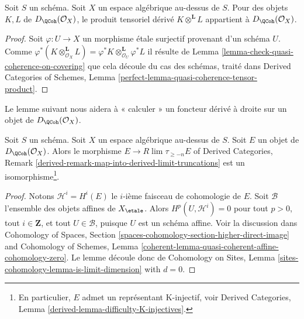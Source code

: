 \begin{lemma}
\label{lemma-quasi-coherence-tensor-product}
Soit $S$ un schéma. Soit $X$ un espace algébrique au-dessus de $S$.
Pour des objets $K, L$ de $D_\QCoh(\mathcal{O}_X)$,
le produit tensoriel dérivé $K \otimes^\mathbf{L} L$ appartient à
$D_\QCoh(\mathcal{O}_X)$.
\end{lemma}

\begin{proof}
Soit $\varphi : U \to X$ un morphisme étale surjectif provenant d'un schéma $U$.
Comme
$\varphi^*(K \otimes_{\mathcal{O}_X}^\mathbf{L} L) =
\varphi^*K \otimes_{\mathcal{O}_U}^\mathbf{L} \varphi^*L$
il résulte de
Lemma \ref{lemma-check-quasi-coherence-on-covering}
que cela découle du cas des schémas, traité dans
Derived Categories of Schemes, Lemma
\ref{perfect-lemma-quasi-coherence-tensor-product}.
\end{proof}

\noindent
Le lemme suivant nous aidera à « calculer » un foncteur dérivé à droite
sur un objet de $D_\QCoh(\mathcal{O}_X)$.

\begin{lemma}
\label{lemma-nice-K-injective}
Soit $S$ un schéma. Soit $X$ un espace algébrique au-dessus de $S$. Soit $E$ un
objet de $D_\QCoh(\mathcal{O}_X)$. Alors le morphisme
$E \to R\lim \tau_{\geq -n}E$ of
Derived Categories, Remark
\ref{derived-remark-map-into-derived-limit-truncations}
est un isomorphisme\footnote{En particulier,
$E$ admet un représentant K-injectif, voir
Derived Categories, Lemma \ref{derived-lemma-difficulty-K-injectives}.}.
\end{lemma}

\begin{proof}
Notons $\mathcal{H}^i = H^i(E)$ le $i$-ième faisceau de cohomologie de $E$.
Soit $\mathcal{B}$ l'ensemble des objets affines de $X_\etale$.
Alors $H^p(U, \mathcal{H}^i) = 0$ pour tout $p > 0$, tout $i \in \mathbf{Z}$,
et tout $U \in \mathcal{B}$, puisque $U$ est un schéma affine.
Voir la discussion dans
Cohomology of Spaces, Section
\ref{spaces-cohomology-section-higher-direct-image}
and
Cohomology of Schemes, Lemma
\ref{coherent-lemma-quasi-coherent-affine-cohomology-zero}.
Le lemme découle donc de
Cohomology on Sites, Lemma \ref{sites-cohomology-lemma-is-limit-dimension}
with $d = 0$.
\end{proof}

